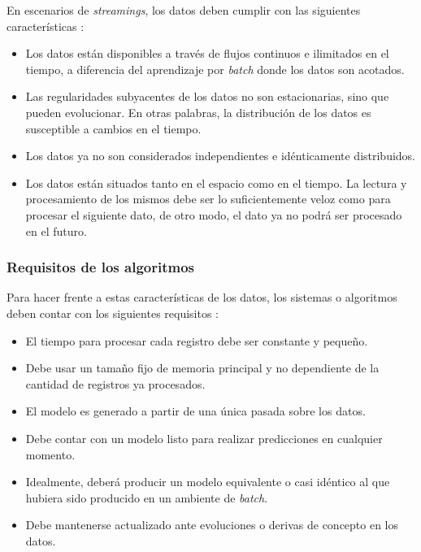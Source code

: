 En escenarios de \textit{streamings}, los datos deben cumplir con las siguientes
características \cite {gama_knowledge_2010}:

\begin{itemize}

	\item Los datos están disponibles a través de flujos continuos e ilimitados
	      en el tiempo, a diferencia del aprendizaje por \textit{batch} donde los
	      datos son acotados.

	\item Las regularidades subyacentes de los datos no son estacionarias, sino
	      que pueden evolucionar. En otras palabras, la distribución de los datos es
	      susceptible a cambios en el tiempo.

	\item Los datos ya no son considerados independientes e idénticamente
	      distribuidos.

	\item Los datos están situados tanto en el espacio como en el tiempo. La
	      lectura y procesamiento de los mismos debe ser lo suficientemente veloz
	      como para procesar el siguiente dato, de otro modo, el dato ya no podrá
	      ser procesado en el futuro.

\end{itemize}

\subsubsection{Requisitos de los algoritmos}
\label{stream_requisitos}

Para hacer frente a estas características de los datos, los sistemas o
algoritmos deben contar con los siguientes requisitos \cite{hulten_mining_2001}:

\begin{itemize}

	\item El tiempo para procesar cada registro debe ser constante y pequeño.

	\item Debe usar un tamaño fijo de memoria principal y no dependiente de la
	      cantidad de registros ya procesados.

	\item El modelo es generado a partir de una única pasada sobre los datos.

	\item Debe contar con un modelo listo para realizar predicciones en cualquier
	      momento.

	\item Idealmente, deberá producir un modelo equivalente o casi idéntico al que
	      hubiera sido producido en un ambiente de \textit{batch}.

	\item Debe mantenerse actualizado ante evoluciones o derivas de concepto en
	      los datos.

\end{itemize}

